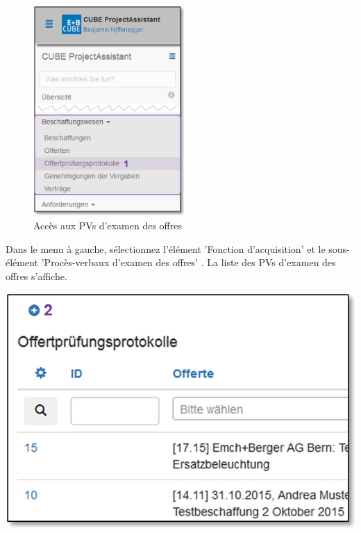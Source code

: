 \begin{figure}
  \vspace{-30pt}      %
  \begin{center}
    \includegraphics[height=80mm]{../chapters/07_Beschaffungswesen/pictures/7-1-6_Menu_Besch_Offertp.jpg}
  \end{center}
  \vspace{-20pt}
  \caption{Accès aux PVs d'examen des offres}
  \vspace{-10pt}
\end{figure}

Dans le menu à gauche, sélectionnez l'élément 'Fonction d'acquisition' et le sous-élément 'Procès-verbaux d'examen des offres' . La liste des PVs d'examen des offres s'affiche.

\begin{center}
\hspace{-15pt}   
\includegraphics[width=.75\linewidth]{../chapters/07_Beschaffungswesen/pictures/7-1-6_NeuesOffertPruefProtokoll.jpg}
\end{center}

